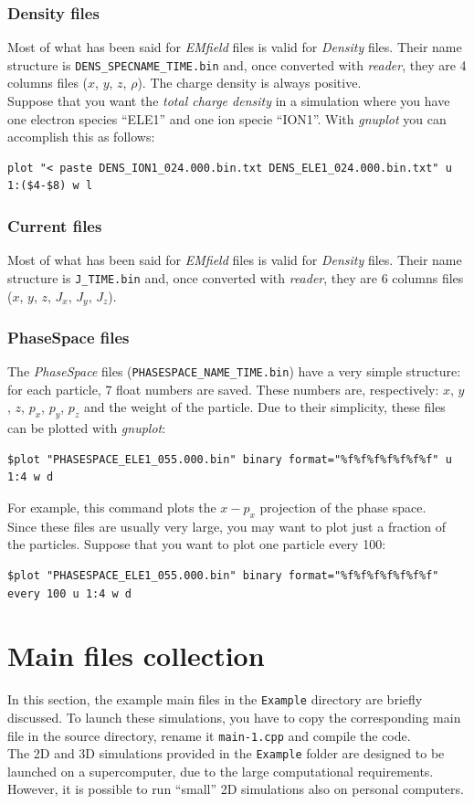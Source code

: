 \documentclass[11pt,a4paper]{report}
\begin{document}
\subsection{Density files}
Most of what has been said for \emph{EMfield} files is valid for \emph{Density} files. Their name structure is \verb+DENS_SPECNAME_TIME.bin+ and, once converted with \emph{reader}, they are 4 columns files ($x$, $y$, $z$, $\rho$). The charge density is always positive.\\
Suppose that you want the \emph{total charge density} in a simulation where you have one electron species ``ELE1'' and one ion specie ``ION1''. With \emph{gnuplot} you can accomplish this as follows:
\begin{verbatim}
plot "< paste DENS_ION1_024.000.bin.txt DENS_ELE1_024.000.bin.txt" u 1:($4-$8) w l
\end{verbatim}

\subsection{Current files}
Most of what has been said for \emph{EMfield} files is valid for \emph{Density} files. Their name structure is \verb+J_TIME.bin+ and, once converted with \emph{reader}, they are 6 columns files ($x$, $y$, $z$, $J_x$, $J_y$, $J_z$). 

\subsection{PhaseSpace files}
The \emph{PhaseSpace} files (\verb+PHASESPACE_NAME_TIME.bin+) have a very simple structure: for each particle, 7 float numbers are saved. These numbers are, respectively: $x$, $y$, $z$, $p_x$, $p_y$, $p_z$ and the weight of the particle. Due to their simplicity, these files can be plotted with \emph{gnuplot}: 
\begin{verbatim}
$plot "PHASESPACE_ELE1_055.000.bin" binary format="%f%f%f%f%f%f%f" u 1:4 w d
\end{verbatim}
For example, this command plots the $x-p_x$ projection of the phase space.\\
Since these files are usually very large, you may want to plot just a fraction of the particles. Suppose that you want to plot one particle every 100:
\begin{verbatim}
$plot "PHASESPACE_ELE1_055.000.bin" binary format="%f%f%f%f%f%f%f" every 100 u 1:4 w d
\end{verbatim} 

\chapter{Main files collection}
In this section, the example main files in the \verb+Example+ directory are briefly discussed. To launch these simulations, you have to copy the corresponding main file in the source directory, rename it \verb+main-1.cpp+ and compile the code.\\
The 2D and 3D simulations provided in the \verb+Example+ folder are designed to be launched on a supercomputer, due to the large computational requirements. However, it is possible to run ``small'' 2D simulations also on personal computers. 
\end{document}
